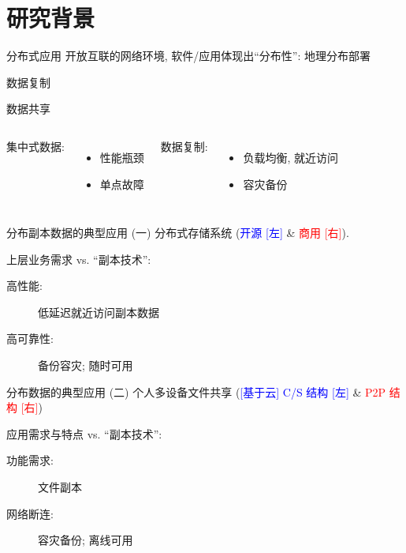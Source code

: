 \section{研究背景}

\begin{frame}{分布式应用}
  开放互联的网络环境, 软件/应用体现出``分布性'': 地理分布部署

\end{frame}

\begin{frame}{数据复制}
  \begin{center}
    数据共享
  \end{center}


  \begin{columns}
      集中式数据:
      \begin{itemize}
	\item 性能瓶颈
	\item 单点故障
      \end{itemize}
      数据复制:
      \begin{itemize}
	\item 负载均衡, 就近访问
	\item 容灾备份
      \end{itemize}
  \end{columns}
\end{frame}
\begin{frame}{分布副本数据的典型应用 (一)}
  {分布式存储系统 (\textcolor{blue}{\scriptsize 开源 [左]} \& \textcolor{red}{\scriptsize 商用 [右]})}.

  上层业务需求  vs. ``副本技术'':
  \begin{description}
    \item[高性能:] 低延迟就近访问副本数据
    \item[高可靠性:] 备份容灾; 随时可用
  \end{description}
\end{frame}
\begin{frame}{分布数据的典型应用 (二)}
  {个人多设备文件共享 {(\textcolor{blue}{\scriptsize [基于云] C/S 结构 [左]} \& 
  \textcolor{red}{\scriptsize P2P 结构 [右]})}}

  应用需求与特点  vs. ``副本技术'':
  \begin{description}
    \item[功能需求:] 文件副本
    \item[网络断连:] 容灾备份; 离线可用
  \end{description}
\end{frame}
